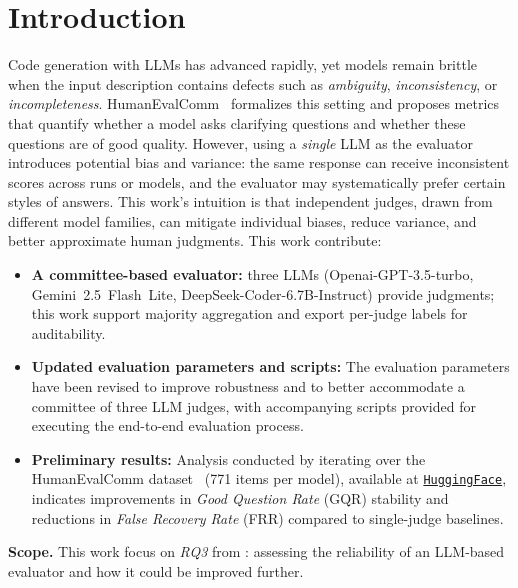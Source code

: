 \documentclass[acmsmall,screen,nonacm]{acmart}
\begin{document}
\section{Introduction}
Code generation with LLMs has advanced rapidly, yet models remain brittle when the input description contains defects such as \emph{ambiguity}, \emph{inconsistency}, or \emph{incompleteness}. HumanEvalComm~\cite{WuFard2025HumanEvalComm} formalizes this setting and proposes metrics that quantify whether a model asks clarifying questions and whether these questions are of good quality. However, using a \emph{single} LLM as the evaluator introduces potential bias and variance: the same response can receive inconsistent scores across runs or models, and the evaluator may systematically prefer certain styles of answers. This work's intuition is that independent judges, drawn from different model families, can mitigate individual biases, reduce variance, and better approximate human judgments. This work contribute:\vspace{2pt}

\begin{itemize}[leftmargin=1.2em, itemsep=0.5em]
  \item \textbf{A committee-based evaluator:} three LLMs (Openai-GPT-3.5-turbo, Gemini~2.5~Flash~Lite, DeepSeek-Coder-6.7B-Instruct) provide judgments; this work support majority aggregation and export per-judge labels for auditability.
  
    \item \textbf{Updated evaluation parameters and scripts:} The evaluation parameters have been revised to improve robustness and to better accommodate a committee of three LLM judges, with accompanying scripts provided for executing the end-to-end evaluation process.
  
\item \textbf{Preliminary results:} Analysis conducted by iterating over the HumanEvalComm dataset~\cite{WuFard2025HumanEvalComm} (771 items per model), available at \href{https://huggingface.co/datasets/jie-jw-wu/HumanEvalComm}{\texttt{HuggingFace}}, indicates improvements in \emph{Good Question Rate} (GQR) stability and reductions in \emph{False Recovery Rate} (FRR) compared to single-judge baselines.


\end{itemize}

\noindent\textbf{Scope.} This work focus on \emph{RQ3} from \citet{WuFard2025HumanEvalComm}: assessing the reliability of an LLM-based evaluator and how it could be improved further. 
\end{document}
